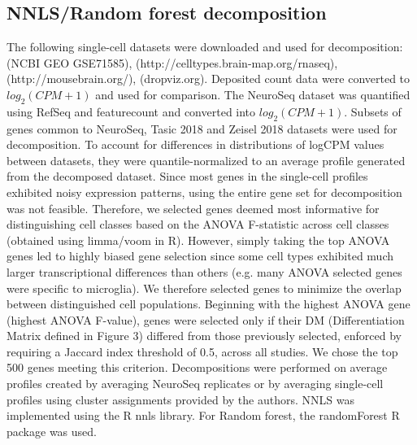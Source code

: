\subsection{NNLS/Random forest decomposition}
The following single-cell datasets were downloaded and used for decomposition: \cite{Tasic_2016} (NCBI GEO GSE71585),  \cite{Tasic_2018} (http://celltypes.brain-map.org/rnaseq), \cite{Zeisel_2018} (http://mousebrain.org/), \cite{Saunders_2018} (dropviz.org). Deposited count data were converted to $log_2(CPM+1)$ and used for comparison. The NeuroSeq dataset was quantified using RefSeq and featurecount \citep{Liao_2013} and converted into $log_2(CPM+1)$. Subsets of genes common to NeuroSeq, Tasic 2018 and Zeisel 2018 datasets were used for decomposition. To account for differences in distributions of logCPM values between datasets, they were quantile-normalized to an average profile generated from the decomposed dataset. Since most genes in the single-cell profiles exhibited noisy expression patterns, using the entire gene set for decomposition was not feasible. Therefore, we selected genes deemed most informative for distinguishing cell classes based on the ANOVA F-statistic across cell classes (obtained using limma/voom in R). However, simply taking the top ANOVA genes led to highly biased gene selection since some cell types exhibited much larger transcriptional differences than others (e.g. many ANOVA selected genes were specific to microglia). We therefore selected genes to minimize the overlap between distinguished cell populations. Beginning with the highest ANOVA gene (highest ANOVA F-value), genes were selected only if their DM (Differentiation Matrix defined in Figure 3) differed from those previously selected, enforced by requiring a Jaccard index threshold of 0.5, across all studies. We chose the top 500 genes meeting this criterion. Decompositions were performed on average profiles created by averaging NeuroSeq replicates or by averaging single-cell profiles using cluster assignments provided by the authors. NNLS was implemented using the R nnls library. For Random forest, the randomForest R package was used.

